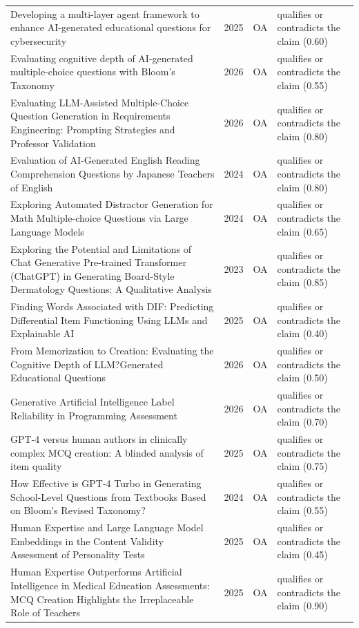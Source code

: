 \begin{longtable}{@{}%
  >{\raggedright\arraybackslash}p{}c%
  >{\raggedright\arraybackslash}p{}%
  >{\raggedright\arraybackslash}p{}@{}}
Developing a multi-layer agent framework to enhance AI-generated educational questions for cybersecurity & 2025 & OA & qualifies or contradicts the claim (0.60) \\
Evaluating cognitive depth of AI-generated multiple-choice questions with Bloom's Taxonomy & 2026 & OA & qualifies or contradicts the claim (0.55) \\
Evaluating LLM-Assisted Multiple-Choice Question Generation in Requirements Engineering: Prompting Strategies and Professor Validation & 2026 & OA & qualifies or contradicts the claim (0.80) \\
Evaluation of AI-Generated English Reading Comprehension Questions by Japanese Teachers of English & 2024 & OA & qualifies or contradicts the claim (0.80) \\
Exploring Automated Distractor Generation for Math Multiple-choice Questions via Large Language Models & 2024 & OA & qualifies or contradicts the claim (0.65) \\
Exploring the Potential and Limitations of Chat Generative Pre-trained Transformer (ChatGPT) in Generating Board-Style Dermatology Questions: A Qualitative Analysis & 2023 & OA & qualifies or contradicts the claim (0.85) \\
Finding Words Associated with DIF: Predicting Differential Item Functioning Using LLMs and Explainable AI & 2025 & OA & qualifies or contradicts the claim (0.40) \\
From Memorization to Creation: Evaluating the Cognitive Depth of LLM?Generated Educational Questions & 2026 & OA & qualifies or contradicts the claim (0.50) \\
Generative Artificial Intelligence Label Reliability in Programming Assessment & 2026 & OA & qualifies or contradicts the claim (0.70) \\
GPT-4 versus human authors in clinically complex MCQ creation: A blinded analysis of item quality & 2025 & OA & qualifies or contradicts the claim (0.75) \\
How Effective is GPT-4 Turbo in Generating School-Level Questions from Textbooks Based on Bloom's Revised Taxonomy? & 2024 & OA & qualifies or contradicts the claim (0.55) \\
Human Expertise and Large Language Model Embeddings in the Content Validity Assessment of Personality Tests & 2025 & OA & qualifies or contradicts the claim (0.45) \\
Human Expertise Outperforms Artificial Intelligence in Medical Education Assessments: MCQ Creation Highlights the Irreplaceable Role of Teachers & 2025 & OA & qualifies or contradicts the claim (0.90) \\

\end{longtable}

